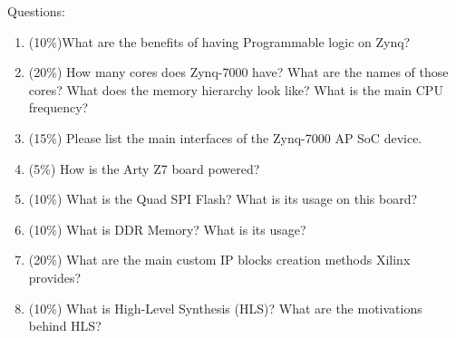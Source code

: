 \documentclass[a4paper,12pt,twoside]{article}
\begin{document}
Questions:
\begin{enumerate}
    \item (10\%)What are the benefits of having Programmable logic on Zynq?
    \item (20\%) How many cores does Zynq-7000 have? What are the names of those cores? What does the memory hierarchy look like? What is the main CPU frequency? 
    \item (15\%) Please list the main interfaces of the Zynq-7000 AP SoC device.
    \item (5\%) How is the Arty Z7 board powered?
    \item (10\%) What is the Quad SPI Flash? What is its usage on this board?
    \item (10\%) What is DDR Memory? What is its usage?
    \item (20\%) What are the main custom IP blocks creation methods Xilinx provides?
    \item (10\%) What is High-Level Synthesis (HLS)? What are the motivations behind HLS? 
\end{enumerate}
\newpage
\end{document}
